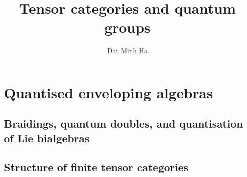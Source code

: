 

\setcounter{chapter}{-1}
\setcounter{section}{-1}





	\title{Tensor categories and quantum groups}
	
	\author{Dat Minh Ha}
	\maketitle
	
	\begin{abstract}
	    
	\end{abstract}
	
	{
      \hypersetup{} 
      \dominitoc
      \tableofcontents %
    }
    
    
    
    \part{Quantised enveloping algebras}
        \chapter{Braidings, quantum doubles, and quantisation of Lie bialgebras}
            \begin{abstract}
            
            \end{abstract}
            
            \minitoc
        
            
    
    \begin{appendices}
        \chapter{Structure of finite tensor categories}
            \begin{abstract}
            
            \end{abstract}
            
            \minitoc
        
            
            
            
    \end{appendices}
	
	\printbibliography

